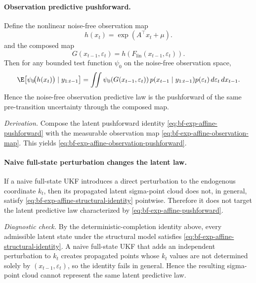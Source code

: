 \paragraph{Observation predictive pushforward.}
\label{lem:bf-exp-affine-observation-pushforward}
Define the nonlinear noise-free observation map
\begin{equation}
  h(x_t)=\exp(A^\top x_t+\mu).
  \label{eq:bf-exp-affine-observation-map}
\end{equation}
and the composed map
\begin{equation}
  G(x_{t-1},\varepsilon_t)
  =
  h\!\left(F_{\mathrm{lin}}(x_{t-1},\varepsilon_t)\right).
  \label{eq:bf-exp-affine-composed-map}
\end{equation}
Then for any bounded test function $\psi_0$ on the noise-free observation
space,
\begin{equation}
  \E\!\left[\psi_0\!\bigl(h(x_t)\bigr)\mid y_{1:t-1}\right]
  =
  \iint
  \psi_0\!\left(G(x_{t-1},\varepsilon_t)\right)
  p(x_{t-1}\mid y_{1:t-1})p(\varepsilon_t)
  \, d\varepsilon_t \, dx_{t-1}.
  \label{eq:bf-exp-affine-observation-pushforward}
\end{equation}
Hence the noise-free observation predictive law is the pushforward of the same
pre-transition uncertainty through the composed map.

\emph{Derivation.}
Compose the latent pushforward identity
\eqref{eq:bf-exp-affine-pushforward} with the measurable observation map
\eqref{eq:bf-exp-affine-observation-map}.  This yields
\eqref{eq:bf-exp-affine-observation-pushforward}.

\paragraph{Naive full-state perturbation changes the latent law.}
\label{lem:bf-exp-affine-naive-full-state-support-violation}
If a naive full-state UKF introduces a direct perturbation to the endogenous
coordinate $k_t$, then its propagated latent sigma-point cloud does not, in
general, satisfy \eqref{eq:bf-exp-affine-structural-identity} pointwise.
Therefore it does not target the latent predictive law characterized by
\eqref{eq:bf-exp-affine-pushforward}.

\emph{Diagnostic check.}
By the deterministic-completion identity above, every admissible
latent state under the structural model satisfies
\eqref{eq:bf-exp-affine-structural-identity}.  A naive full-state UKF that adds
an independent perturbation to $k_t$ creates propagated points whose $k_t$
values are not determined solely by $(x_{t-1},\varepsilon_t)$, so the identity
fails in general.  Hence the resulting sigma-point cloud cannot represent the
same latent predictive law.

